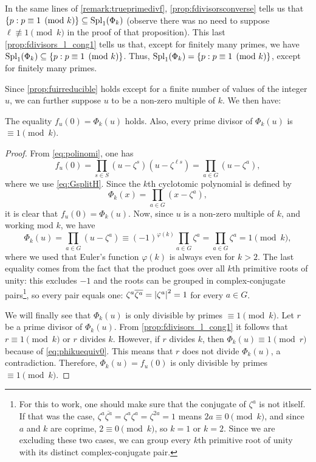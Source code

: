 \documentclass[../main.tex]{subfiles}
\begin{document}
\begin{remark}\label{remark:trueprimedivphi}
	In the same lines of \cref{remark:trueprimedivf}, \cref{prop:fdivisorsconverse} tells us that $\{p: p\equiv 1\pmod{k}\}\subseteq\operatorname{Spl}_1(\Phi_k)$ (observe there was no need to suppose $\ell\not\equiv 1\pmod{k}$ in the proof of that proposition). This last \cref{prop:fdivisors_l_cong1} tells us that, except for finitely many primes, we have $\operatorname{Spl}_1(\Phi_k)\subseteq\{p: p\equiv 1\pmod{k}\}$. Thus, $\operatorname{Spl}_1(\Phi_k)=\{p: p\equiv 1\pmod{k}\}$, except for finitely many primes.
\end{remark}

Since \cref{prop:fuirreducible} holds except for a finite number of values of the integer $u$, we can further suppose $u$ to be a non-zero multiple of $k$. We then have:
\begin{lemma}\label{lemma:integervalcyclo}
	The equality $f_u(0)=\Phi_k(u)$ holds. Also, every prime divisor of $\Phi_k(u)$ is $\equiv 1 \pmod{k}$. 
\end{lemma}
\begin{proof}
From \cref{eq:polinomi}, one has
\begin{equation}\label{eq:fu0}
	f_u(0)=\prod_{s\in S}(u-\zeta^s)(u-\zeta^{\ell s})=\prod_{a\in G}(u-\zeta^a),
\end{equation}
where we use \cref{eq:GsplitH}. Since the $k$th cyclotomic polynomial is defined by
\begin{equation*}
	\Phi_k(x)=\prod_{a\in G}(x-\zeta^a),
\end{equation*}
it is clear that $f_u(0)=\Phi_k(u)$. Now, since $u$ is a non-zero multiple of $k$, and working mod $k$, we have
\begin{equation}\label{eq:phikuequiv0}
	\Phi_k(u)=\prod_{a\in G}(u-\zeta^a)\equiv(-1)^{\varphi(k)}\prod_{a\in G}\zeta^a=\prod_{a \in G}\zeta^a=1 \pmod{k},
\end{equation}
where we used that Euler's function $\varphi(k)$ is always even for $k>2$. The last equality comes from the fact that the product goes over all $k$th primitive roots of unity: this excludes $-1$ and the roots can be grouped in complex-conjugate pairs\footnote{For this to work, one should make sure that the conjugate of $\zeta^a$ is not itlself. If that was the case, $\zeta^a\overline{\zeta^a}=\zeta^a\zeta^a=\zeta^{2a}=1$ means $2a\equiv 0\pmod{k}$, and since $a$ and $k$ are coprime, $2\equiv 0\pmod{k}$, so $k=1$ or $k=2$. Since we are excluding these two cases, we can group every $k$th primitive root of unity with its distinct complex-conjugate pair.}, so every pair equals one: $\zeta^a\overline{\zeta^a}=\abs{\zeta^a}^2=1$ for every $a\in G$.

We will finally see that $\Phi_k(u)$ is only divisible by primes $\equiv 1 \pmod{k}$. Let $r$ be a prime divisor of $\Phi_k(u)$. From \cref{prop:fdivisors_l_cong1} it follows that $r\equiv 1 \pmod{k}$ or $r$ divides $k$. However, if $r$ divides $k$, then $\Phi_k(u)\equiv 1 \pmod{r}$ because of \cref{eq:phikuequiv0}. This means that $r$ does not divide $\Phi_k(u)$, a contradiction. Therefore, $\Phi_k(u)=f_u(0)$ is only divisible by primes $\equiv 1 \pmod{k}$.	
\end{proof}
\end{document}
